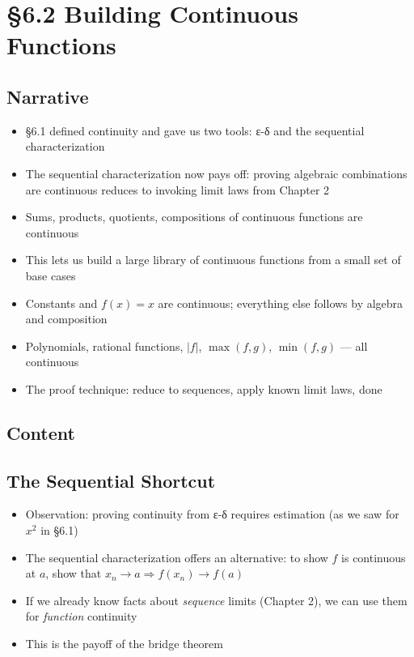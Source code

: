 \documentclass[
  10pt,
  letterpaper,
]{scrbook}
\providecommand{\tightlist}{%
  \setlength{\itemsep}{0pt}\setlength{\parskip}{0pt}}
\begin{document}
\section{§6.2 Building Continuous
Functions}\label{building-continuous-functions}

\subsection{Narrative}\label{narrative-25}

\begin{itemize}
\tightlist
\item
  §6.1 defined continuity and gave us two tools: ε-δ and the sequential
  characterization
\item
  The sequential characterization now pays off: proving algebraic
  combinations are continuous reduces to invoking limit laws from
  Chapter 2
\item
  Sums, products, quotients, compositions of continuous functions are
  continuous
\item
  This lets us build a large library of continuous functions from a
  small set of base cases
\item
  Constants and \(f(x) = x\) are continuous; everything else follows by
  algebra and composition
\item
  Polynomials, rational functions, \(|f|\), \(\max(f,g)\), \(\min(f,g)\)
  --- all continuous
\item
  The proof technique: reduce to sequences, apply known limit laws, done
\end{itemize}

\subsection{Content}\label{content-25}

\subsection{The Sequential Shortcut}\label{the-sequential-shortcut}

\begin{itemize}
\tightlist
\item
  Observation: proving continuity from ε-δ requires estimation (as we
  saw for \(x^2\) in §6.1)
\item
  The sequential characterization offers an alternative: to show \(f\)
  is continuous at \(a\), show that
  \(x_n \to a \Rightarrow f(x_n) \to f(a)\)
\item
  If we already know facts about \emph{sequence} limits (Chapter 2), we
  can use them for \emph{function} continuity
\item
  This is the payoff of the bridge theorem
\end{itemize}
\end{document}
